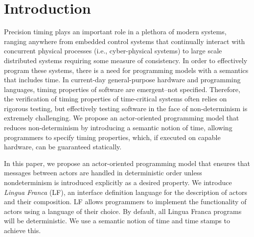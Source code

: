 \documentclass[sigconf]{acmart}
\begin{document}



\maketitle 

\section{Introduction}\label{sec:intro}
Precision timing plays an important role in a plethora of modern systems, ranging anywhere from embedded control systems that continually interact with concurrent physical processes (i.e., cyber-physical systems) to large scale distributed systems requiring some measure of consistency. In order to effectively program these systems, there is a need for programming models with a semantics that includes time. In current-day general-purpose hardware and programming languages, timing properties of software are emergent--not specified. Therefore, the verification of timing properties of time-critical systems often relies on rigorous testing, but effectively testing software in the face of non-determinism is extremely challenging. We propose an actor-oriented programming model that reduces non-determinism by introducing a semantic notion of time, allowing programmers to specify timing properties, which, if executed on capable hardware, can be guaranteed statically.

In this paper, we propose an actor-oriented programming model that ensures that messages between actors are handled in deterministic order unless nondeterminism is introduced explicitly as a desired property. We introduce \emph{Lingua Franca} (LF), an interface definition language for the description of actors and their composition. LF allows programmers to implement the functionality of actors using a language of their choice. By default, all Lingua Franca programs will be deterministic. We use a semantic notion of time and time stamps to achieve this. 


\end{document}

